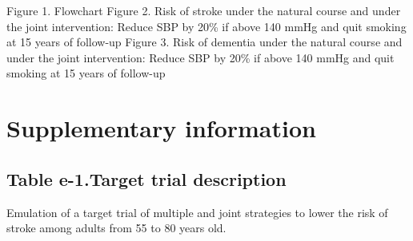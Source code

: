 \documentclass[
]{book}
\begin{document}
Figure 1. Flowchart
Figure 2. Risk of stroke under the natural course and under the joint intervention: Reduce SBP by 20\% if above 140 mmHg and quit smoking at 15 years of follow-up
Figure 3. Risk of dementia under the natural course and under the joint intervention: Reduce SBP by 20\% if above 140 mmHg and quit smoking at 15 years of follow-up

\newpage

\hypertarget{supplementary-information-1}{%
\section{Supplementary information}\label{supplementary-information-1}}

\hypertarget{table-e-1.target-trial-description}{%
\subsection{Table e-1.Target trial description}\label{table-e-1.target-trial-description}}

Emulation of a target trial of multiple and joint strategies to lower the risk of stroke among adults from 55 to 80 years old.
\end{document}
